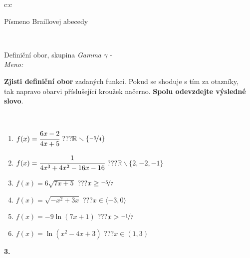 \documentclass[10pt]{report}
\begin{document}
\begin{tabular}{c:c}
\begin{minipage}[c][104.5mm][t]{0.5\linewidth}
\begin{center}
\begin{minipage}{0.20\linewidth}
\begin{center}
{\small Písmeno Braillovej abecedy}
\end{center}
\end{minipage}
\end{center}
\end{minipage}
\\ \hdashline
\begin{minipage}[c][104.5mm][t]{0.5\linewidth}
\begin{center}
\vspace{7mm}
{\huge Definiční obor, skupina \textit{Gamma $\gamma$} -}\\[5mm]
\textit{Meno:}\phantom{xxxxxxxxxxxxxxxxxxxxxxxxxxxxxxxxxxxxxxxxxxxxxxxxxxxxxxxxxxxxxxxxx}\\[5mm]
\begin{minipage}{0.95\linewidth}
\textbf{Zjisti definiční obor} zadaných funkcí. Pokud se shoduje s tím za otazníky,\\tak napravo obarvi příslušející kroužek načerno. \textbf{Spolu odevzdejte výsledné slovo}.
\end{minipage}
\\[1mm]
\begin{minipage}{0.79\linewidth}
\begin{center}
\begin{varwidth}{\linewidth}
\begin{enumerate}
\normalsizerrr
\item $f(x)=\cfrac{6x-2}{4x+5}$\quad \dotfill\; ???\;\dotfill \quad $\mathbb{R}\smallsetminus\{\nicefrac{-5}{4}\}$
\item $f(x)=\cfrac{1}{4x^3+4x^2-16x-16}$\quad \dotfill\; ???\;\dotfill \quad $\mathbb{R}\smallsetminus\{2,-2,-1\}$
\item $f(x)=6\sqrt{7x+5}$\quad \dotfill\; ???\;\dotfill \quad $x\geq\nicefrac{-5}{7}$
\item $f(x)=\sqrt{-x^2+3x}$\quad \dotfill\; ???\;\dotfill \quad $x\in\langle-3 , 0\rangle$
\item $f(x)=-9\ln{(7x+1)}$\quad \dotfill\; ???\;\dotfill \quad $x>\nicefrac{-1}{7}$
\item $f(x)=\ln{(x^2-4x+3)}$\quad \dotfill\; ???\;\dotfill \quad $x\in(1 , 3)$
\end{enumerate}
\end{varwidth}
\end{center}
\end{minipage}
\begin{minipage}{0.20\linewidth}
\begin{center}
{\Huge\bfseries 3.} \\[2mm]

\end{center}
\end{minipage}
\end{center}
\end{minipage}
\end{tabular}
\end{document}

